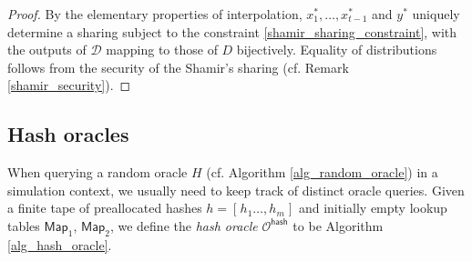 \documentclass{iacrtrans}
\begin{document}
\begin{proof}
By the elementary properties of interpolation,
$x_1^*, \dots, x_{t-1}^*$ and $y^*$
uniquely determine a sharing
subject to the constraint \eqref{shamir_sharing_constraint},
with the outputs of $\mathcal{D}$
mapping to those of $D$ bijectively.
Equality of distributions follows
from the security of the Shamir's sharing
(cf. Remark \ref{shamir_security}).
\end{proof}

\subsection{Hash oracles}\label{section_hash_oracles}

When querying a random oracle $H$
(cf. Algorithm \ref{alg_random_oracle})
in a simulation context,
we usually need to keep track of distinct oracle queries.
Given a finite tape of preallocated hashes
$h = [\hspace{1pt}h_1 \dots, h_m \hspace{1pt}]$
and initially empty lookup tables
$\mathsf{Map}_1$, $\mathsf{Map}_2$,
we define the \textit{hash oracle} $\mathcal{O}^{\mathsf{hash}}$
to be Algorithm \ref{alg_hash_oracle}.
\end{document}
